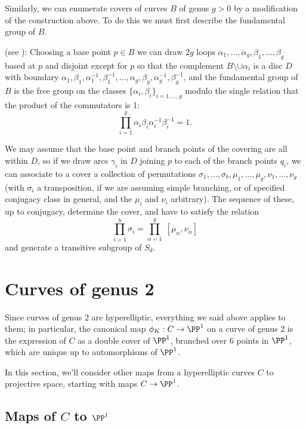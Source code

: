 Similarly, we can enumerate covers of curves $B$ of genus $g>0$ by a modification of the construction above. To do this we must first describe the fundamental group of $B$.
\begin{fact}
  (see \cite{****}):
Choosing a base point $p \in B$ we can draw $2g$ loops $\alpha_1,\dots,\alpha_{g},\beta_1, \dots, \beta_g$ based at $p$ and disjoint except for $p$ so that the complement $B \setminus \cup \alpha_i$ is a disc $D$ with boundary $\alpha_1, \beta_1, \alpha_1^{-1}, \beta_1^{-1}, \dots, \alpha_g, \beta_g, \alpha_g^{-1}, \beta_g^{-1}$,
and the fundamental group of $B$ is the free group on the classes $\{\alpha_i, \beta_i\}_{i=1,\dots,g}$
modulo the single relation that the product of the commutators is 1:
$$
\prod_{i=1}^g \alpha_i\beta_i\alpha_i^{-1}\beta_i^{-1} = 1.
$$
\end{fact}
We may assume that the base point and branch points of the covering are all within $D$, so if we draw arcs $\gamma_i$ in $D$ joining $p$ to each of the branch points $q_i$, we can associate to a cover a collection of permutations $\sigma_1, \dots, \sigma_b, \mu_1,\dots,\mu_g, \nu_1,\dots,\nu_g$ (with $\sigma_i$ a transposition, if we are assuming simple branching, or of specified conjugacy class in general, and the $\mu_i$ and $\nu_i$ arbitrary). The sequence  of these, up to conjugacy, determine the cover, and have to satisfy the relation
$$
\prod_{i=1}^b \sigma_i = \prod_{\alpha=1}^g \; [\mu_\alpha, \nu_\alpha]
$$
and generate a transitive subgroup of $S_d$.


\section{Curves of genus 2}

Since  curves of genus 2 are hyperelliptic, everything we said above applies to them; in particular, the canonical map $\phi_K : C \to \PP^1$ on a curve of genus 2 is the expression of $C$ as a double cover of $\PP^1$, branched over 6 points in $\PP^1$, which are unique up to automorphisms of $\PP^1$. 

In this section, we'll consider other maps from a hyperelliptic curves $C$ to projective space, starting with maps $C \to \PP^1$.

\subsection{Maps of $C$ to $\PP^1$}\label{genus 2 pencil}

